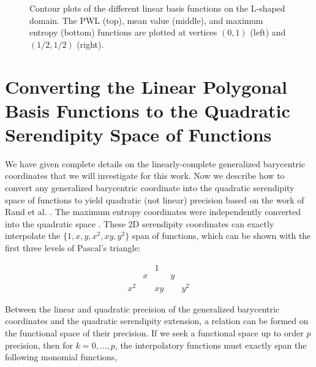 \begin{figure}
{\begin{subfigure}[b]{0.375\textwidth}
	\end{subfigure}
}
\vspace{2mm}
\caption[Contour plots of the linear basis functions on the L-shaped domain.]{Contour plots of the different linear basis functions on the L-shaped domain. The PWL (top), mean value (middle), and maximum entropy (bottom) functions are plotted at vertices $(0,1)$ (left) and $(1/2,1/2)$ (right).}
\label{fig::2DSummary_Ldom_basis_functions}
\end{figure}

\section{Converting the Linear Polygonal Basis Functions to the Quadratic Serendipity Space of Functions}
\label{sec::BF_2DQuadratic}

We have given complete details on the linearly-complete generalized barycentric coordinates that we will investigate for this work. Now we describe how to convert any generalized barycentric coordinate into the quadratic serendipity space of functions to yield quadratic (not linear) precision based on the work of Rand et al. \cite{rand2014quadratic}. The maximum entropy coordinates were independently converted into the quadratic space \cite{gonzalez2010higher,sukumar2013quadratic}. These 2D serendipity coordinates can exactly interpolate the $\{ 1, x, y, x^2, xy, y^2 \}$ span of functions, which can be shown with the first three levels of Pascal's triangle:

\begin{equation}
\label{eq::BF_quad_pascal}
\begin{array}{ccccc}
 & & 1 & & \\
 & x & & y & \\
 x^2 &  &xy & & y^2 
\end{array} \, 
\end{equation}

\noindent Between the linear and quadratic precision of the generalized barycentric coordinates and the quadratic serendipity extension, a relation can be formed on the functional space of their precision. If we seek a functional space up to order $p$ precision, then for $k=0,...,p$, the interpolatory functions must exactly span the following monomial functions,

